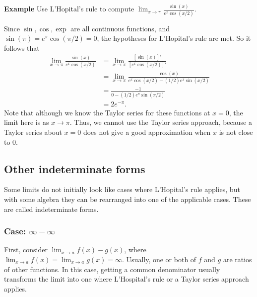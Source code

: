 \documentclass[twoside,openright,titlepage,a4paper]{book}
\begin{document}
\begin{sloppypar}
\textbf{Example} Use L'Hopital's rule to compute $\displaystyle \lim_{x\rightarrow \pi} \frac{\sin(x)}{e^x \cos(x/2)}$. 
\begin{examplebox}
Since $\sin, \cos, \exp$ are all continuous functions, and $\sin(\pi) = e^{\pi} \cos (\pi/2) = 0$, the hypotheses for L'Hopital's rule are met. So it follows that
\begin{align*}
\lim_{x\rightarrow \pi} \frac{\sin(x)}{e^x \cos(x/2)} &= \lim_{x\rightarrow \pi} \frac{[\sin(x)]'}{[e^x \cos(x/2)]'} \\
&= \lim_{x \rightarrow \pi} \frac{\cos(x)}{e^x \cos(x/2) -(1/2)e^x\sin(x/2)} \\
&= \frac{-1}{0 - (1/2)e^{\pi} \sin(\pi/2)} \\
&= 2e^{-\pi}. 
\end{align*}
Note that although we know the Taylor series for these functions at $x=0$, the limit here is as $x \rightarrow \pi$. Thus, we cannot use the Taylor series approach, because a Taylor series about $x=0$ does not give a good approximation when $x$ is not close to 0.
\end{examplebox}

\subsection{Other indeterminate forms}

Some limits do not initially look like cases where L'Hopital's rule applies, but with some algebra they can be rearranged into one of the applicable cases. These are called indeterminate forms.

\subsubsection{Case: $\infty - \infty$}

First, consider $\displaystyle \lim_{x \rightarrow a} f(x) - g(x)$, where $\displaystyle \lim_{x \rightarrow a} f(x) = \lim_{x\rightarrow a} g(x) = \infty$. Usually, one or both of $f$ and $g$ are ratios of other functions. In this case, getting a common denominator usually transforms the limit into one where L'Hospital's rule or a Taylor series approach applies.


\end{sloppypar}
\end{document}
